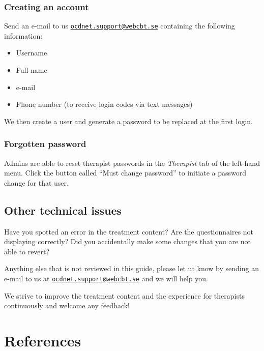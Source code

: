 \documentclass[]{book}
\providecommand{\tightlist}{%
  \setlength{\itemsep}{0pt}\setlength{\parskip}{0pt}}
\theoremstyle{definition}
\theoremstyle{definition}
\theoremstyle{definition}
\theoremstyle{remark}
\begin{document}
\hypertarget{creating-an-account}{%
\subsection{Creating an account}\label{creating-an-account}}

Send an e-mail to us
\href{mailto:ocdnet.support@webcbt.se}{\nolinkurl{ocdnet.support@webcbt.se}}
containing the following information:

\begin{itemize}
\tightlist
\item
  Username
\item
  Full name
\item
  e-mail
\item
  Phone number (to receive login codes via text messages)
\end{itemize}

We then create a user and generate a password to be replaced at the
first login.

\hypertarget{forgotten-password}{%
\subsection{Forgotten password}\label{forgotten-password}}

Admins are able to reset therapist passwords in the \emph{Therapist} tab
of the left-hand menu. Click the button called ``Must change password''
to initiate a password change for that user.

\hypertarget{other-technical-issues}{%
\section{Other technical issues}\label{other-technical-issues}}

Have you spotted an error in the treatment content? Are the
questionnaires not displaying correctly? Did you accidentally make some
changes that you are not able to revert?

Anything else that is not reviewed in this guide, please let ut know by
sending an e-mail to us at
\href{mailto:ocdnet.support@webcbt.se}{\nolinkurl{ocdnet.support@webcbt.se}}
and we will help you.

We strive to improve the treatment content and the experience for
therapists continuously and welcome any feedback!

\hypertarget{references}{%
\chapter{References}\label{references}}


\end{document}
